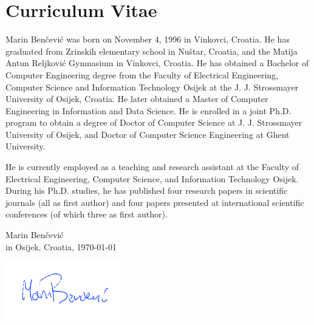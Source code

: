 \documentclass[
  11pt, %
  oneside, %
  english, %
  singlespacing, %
  liststotoc, %
  headsepline, %
  chapterinoneline, %
]{MastersDoctoralThesis} %
\begin{document}
\begin{refsection}

\printbibliography[heading=subbibintoc]
\end{refsection}

\begin{refsection}

\printbibliography[heading=subbibintoc]
\end{refsection}





\pagestyle{plain}
\chapter{Curriculum Vitae}

Marin Benčević was born on November 4, 1996 in Vinkovci, Croatia. He has graduated from Zrinskih elementary school in Nuštar, Croatia, and the Matija Antun Reljković Gymnasium in Vinkovci, Croatia. He has obtained a Bachelor of Computer Engineering degree from the Faculty of Electrical Engineering, Computer Science and Information Technology Osijek at the J. J. Strossmayer University of Osijek, Croatia. He later obtained a Master of Computer Engineering in Information and Data Science. He is enrolled in a joint Ph.D. program to obtain a degree of Doctor of Computer Science at J. J. Strossmayer University of Osijek, and Doctor of Computer Science Engineering at Ghent University.

He is currently employed as a teaching and research assistant at the Faculty of Electrical Engineering, Computer Science, and Information Technology Osijek. During his Ph.D. studies, he has published four research papers in scientific journals (all as first author) and four papers presented at international scientific conferences (of which three as first author).

\vspace{3cm}

\begin{flushright}
Marin Benčević\\
in Osijek, Croatia, \today

\includegraphics[width=5cm]{images/signature.png}
\end{flushright}
\end{document}
